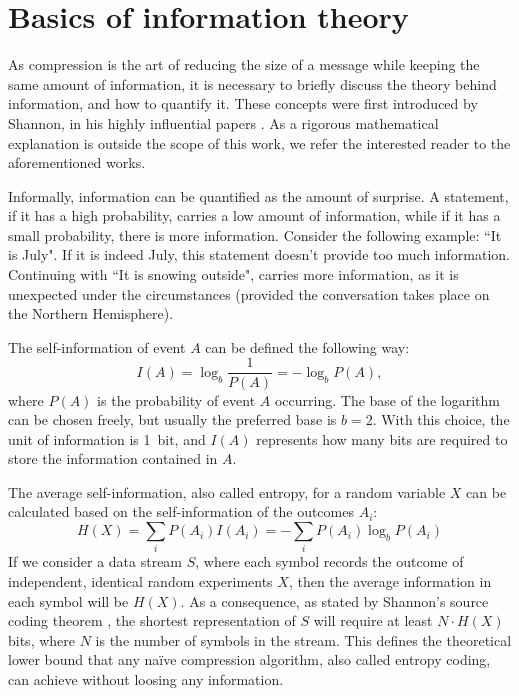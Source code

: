   
    \section{Basics of information theory}
      \label{sec:entropy}
      As compression is the art of reducing the size of a message while keeping the same amount of information, it is necessary to briefly discuss the theory behind information, and how to quantify it. These concepts were first introduced by Shannon, in his highly influential papers \cite{shannon_mathematical_1948,shannon_mathematical_1948-1,shannon_prediction_1951}. As a rigorous mathematical explanation is outside the scope of this work, we refer the interested reader to the aforementioned works.
  
      Informally, information can be quantified as the amount of surprise. A statement, if it has a high probability, carries a low amount of information, while if it has a small probability, there is more information. Consider the following example: ``It is July". If it is indeed July, this statement doesn't provide too much information. Continuing with ``It is snowing outside", carries more information, as it is unexpected under the circumstances (provided the conversation takes place on the Northern Hemisphere).
  
      The self-information of event $A$ can be defined the following way:
      \begin{equation}
        I(A) = \log_b \frac{1}{P(A)} = - \log_b P(A),
        \label{eq:selfInfo}
      \end{equation}
      where $P(A)$ is the probability of event $A$ occurring. The base of the logarithm can be chosen freely, but usually the preferred base is $b=2$. With this choice, the unit of information is \SI{1}{bit}, and $I(A)$ represents how many bits are required to store the information contained in $A$.
  
      The average self-information, also called entropy, for a random variable $X$ can be calculated based on the self-information of the outcomes $A_i$:
      \begin{equation}
        H(X) = \sum_i P(A_i)I(A_i) = - \sum_i P(A_i) \log_b P(A_i)
        \label{eq:entropy}
      \end{equation}
      If we consider a data stream $S$, where each symbol records the outcome of independent, identical random experiments $X$, then the average information in each symbol will be $H(X)$. As a consequence, as stated by Shannon's source coding theorem \cite{shannon_mathematical_1948}, the shortest representation of $S$ will require at least $N\cdot H(X)$ bits, where $N$ is the number of symbols in the stream. This defines the theoretical lower bound that any na\"ive compression algorithm, also called entropy coding, can achieve without loosing any information.
  
